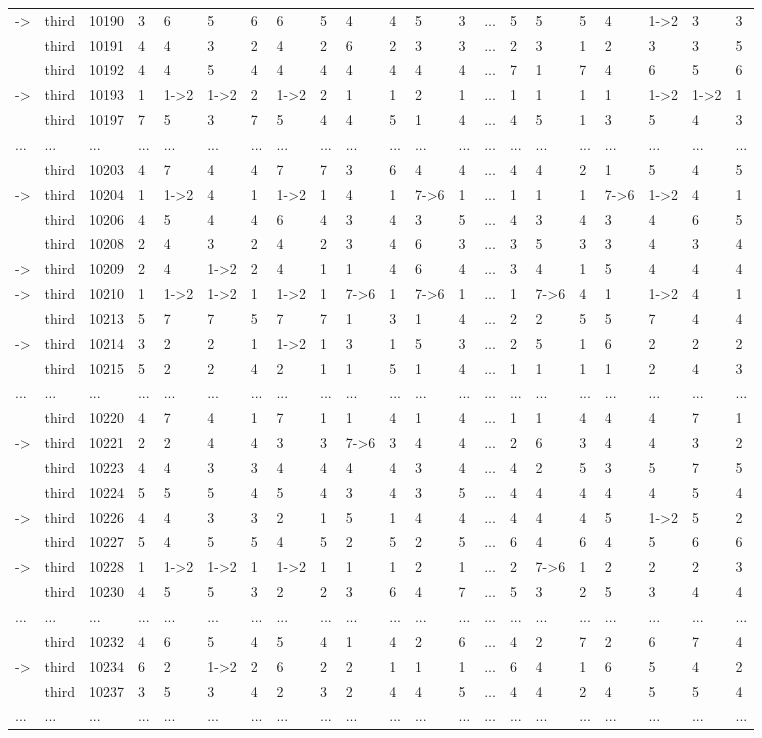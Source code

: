 \begin{landscape}
{\begin{longtable}{lllllllllllllllllllll}
\newpage
-\textgreater &third&10190&3&6&5&6&6&5&4&4&5&3&...&5&5&5&4&1-\textgreater 2&3&3\tabularnewline
&third&10191&4&4&3&2&4&2&6&2&3&3&...&2&3&1&2&3&3&5\tabularnewline
&third&10192&4&4&5&4&4&4&4&4&4&4&...&7&1&7&4&6&5&6\tabularnewline
-\textgreater &third&10193&1&1-\textgreater 2&1-\textgreater 2&2&1-\textgreater 2&2&1&1&2&1&...&1&1&1&1&1-\textgreater 2&1-\textgreater 2&1\tabularnewline
&third&10197&7&5&3&7&5&4&4&5&1&4&...&4&5&1&3&5&4&3\tabularnewline
...&...&...&...&...&...&...&...&...&...&...&...&...&...&...&...&...&...&...&...&...\tabularnewline
&third&10203&4&7&4&4&7&7&3&6&4&4&...&4&4&2&1&5&4&5\tabularnewline
-\textgreater &third&10204&1&1-\textgreater 2&4&1&1-\textgreater 2&1&4&1&7-\textgreater 6&1&...&1&1&1&7-\textgreater 6&1-\textgreater 2&4&1\tabularnewline
&third&10206&4&5&4&4&6&4&3&4&3&5&...&4&3&4&3&4&6&5\tabularnewline
&third&10208&2&4&3&2&4&2&3&4&6&3&...&3&5&3&3&4&3&4\tabularnewline
-\textgreater &third&10209&2&4&1-\textgreater 2&2&4&1&1&4&6&4&...&3&4&1&5&4&4&4\tabularnewline
-\textgreater &third&10210&1&1-\textgreater 2&1-\textgreater 2&1&1-\textgreater 2&1&7-\textgreater 6&1&7-\textgreater 6&1&...&1&7-\textgreater 6&4&1&1-\textgreater 2&4&1\tabularnewline
&third&10213&5&7&7&5&7&7&1&3&1&4&...&2&2&5&5&7&4&4\tabularnewline
-\textgreater &third&10214&3&2&2&1&1-\textgreater 2&1&3&1&5&3&...&2&5&1&6&2&2&2\tabularnewline
&third&10215&5&2&2&4&2&1&1&5&1&4&...&1&1&1&1&2&4&3\tabularnewline
...&...&...&...&...&...&...&...&...&...&...&...&...&...&...&...&...&...&...&...&...\tabularnewline
&third&10220&4&7&4&1&7&1&1&4&1&4&...&1&1&4&4&4&7&1\tabularnewline
-\textgreater &third&10221&2&2&4&4&3&3&7-\textgreater 6&3&4&4&...&2&6&3&4&4&3&2\tabularnewline
&third&10223&4&4&3&3&4&4&4&4&3&4&...&4&2&5&3&5&7&5\tabularnewline
&third&10224&5&5&5&4&5&4&3&4&3&5&...&4&4&4&4&4&5&4\tabularnewline
-\textgreater &third&10226&4&4&3&3&2&1&5&1&4&4&...&4&4&4&5&1-\textgreater 2&5&2\tabularnewline
&third&10227&5&4&5&5&4&5&2&5&2&5&...&6&4&6&4&5&6&6\tabularnewline
-\textgreater &third&10228&1&1-\textgreater 2&1-\textgreater 2&1&1-\textgreater 2&1&1&1&2&1&...&2&7-\textgreater 6&1&2&2&2&3\tabularnewline
&third&10230&4&5&5&3&2&2&3&6&4&7&...&5&3&2&5&3&4&4\tabularnewline
...&...&...&...&...&...&...&...&...&...&...&...&...&...&...&...&...&...&...&...&...\tabularnewline
&third&10232&4&6&5&4&5&4&1&4&2&6&...&4&2&7&2&6&7&4\tabularnewline
-\textgreater &third&10234&6&2&1-\textgreater 2&2&6&2&2&1&1&1&...&6&4&1&6&5&4&2\tabularnewline
&third&10237&3&5&3&4&2&3&2&4&4&5&...&4&4&2&4&5&5&4\tabularnewline
...&...&...&...&...&...&...&...&...&...&...&...&...&...&...&...&...&...&...&...&...\tabularnewline
\hline
\end{longtable}}\end{landscape}




